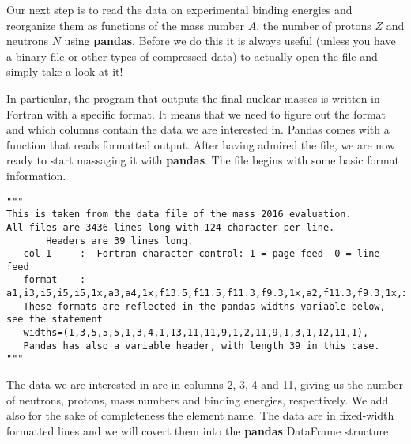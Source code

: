 \documentclass[%
oneside,                 %
final,                   %
10pt]{article}
\begin{document}
Our next step is to read the data on experimental binding energies and
reorganize them as functions of the mass number $A$, the number of
protons $Z$ and neutrons $N$ using \textbf{pandas}.  Before we do this it is
always useful (unless you have a binary file or other types of compressed
data) to actually open the file and simply take a look at it!


In particular, the program that outputs the final nuclear masses is written in Fortran with a specific format. It means that we need to figure out the format and which columns contain the data we are interested in. Pandas comes with a function that reads formatted output. After having admired the file, we are now ready to start massaging it with \textbf{pandas}. The file begins with some basic format information.
\begin{verbatim}
"""                                                                                                                         
This is taken from the data file of the mass 2016 evaluation.                                                               
All files are 3436 lines long with 124 character per line.                                                                  
       Headers are 39 lines long.                                                                                           
   col 1     :  Fortran character control: 1 = page feed  0 = line feed                                                     
   format    :  a1,i3,i5,i5,i5,1x,a3,a4,1x,f13.5,f11.5,f11.3,f9.3,1x,a2,f11.3,f9.3,1x,i3,1x,f12.5,f11.5                     
   These formats are reflected in the pandas widths variable below, see the statement                                       
   widths=(1,3,5,5,5,1,3,4,1,13,11,11,9,1,2,11,9,1,3,1,12,11,1),                                                            
   Pandas has also a variable header, with length 39 in this case.                                                          
"""
\end{verbatim}

The data we are interested in are in columns 2, 3, 4 and 11, giving us
the number of neutrons, protons, mass numbers and binding energies,
respectively. We add also for the sake of completeness the element name. The data are in fixed-width formatted lines and we will
covert them into the \textbf{pandas} DataFrame structure.
\end{document}
